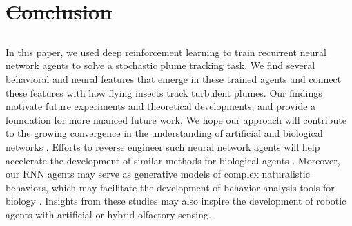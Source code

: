 \documentclass[5p,twocolumn,authoryear]{elsarticle}
\providecommand{\DIFaddtex}[1]{{\protect\color{blue}\uwave{#1}}} %
\providecommand{\DIFdeltex}[1]{{\protect\color{red}\sout{#1}}}                      %
\providecommand{\DIFaddbegin}{} %
\providecommand{\DIFaddend}{} %
\providecommand{\DIFdelbegin}{} %
\providecommand{\DIFdelend}{} %
\providecommand{\DIFadd}[1]{\texorpdfstring{\DIFaddtex{#1}}{#1}} %
\providecommand{\DIFdel}[1]{\texorpdfstring{\DIFdeltex{#1}}{}} %
\newcommand{\DIFscaledelfig}{0.5}
\newlength{\DIFdelgraphicswidth} %
\newlength{\DIFdelgraphicsheight} %
\newcommand{\DIFaddincludegraphics}[2][]{{\color{blue}\fbox{\DIFOincludegraphics[#1]{#2}}}} %
\newcommand{\DIFdelincludegraphics}[2][]{%
\sbox{\DIFdelgraphicsbox}{\DIFOincludegraphics[#1]{#2}}%
\settoboxwidth{\DIFdelgraphicswidth}{\DIFdelgraphicsbox} %
\settoboxtotalheight{\DIFdelgraphicsheight}{\DIFdelgraphicsbox} %
\scalebox{\DIFscaledelfig}{%
\parbox[b]{\DIFdelgraphicswidth}{\usebox{\DIFdelgraphicsbox}\\[-\baselineskip] \rule{\DIFdelgraphicswidth}{0em}}\llap{\resizebox{\DIFdelgraphicswidth}{\DIFdelgraphicsheight}{%
\setlength{\unitlength}{\DIFdelgraphicswidth}%
\begin{picture}(1,1)%
\thicklines\linethickness{2pt} %
{\color[rgb]{1,0,0}\put(0,0){\framebox(1,1){}}}%
{\color[rgb]{1,0,0}\put(0,0){\line( 1,1){1}}}%
{\color[rgb]{1,0,0}\put(0,1){\line(1,-1){1}}}%
\end{picture}%
}\hspace*{3pt}}} %
} %
\DeclareRobustCommand{\DIFaddbegin}{\DIFOaddbegin \let\includegraphics\DIFaddincludegraphics} %
\DeclareRobustCommand{\DIFaddend}{\DIFOaddend \let\includegraphics\DIFOincludegraphics} %
\DeclareRobustCommand{\DIFdelbegin}{\DIFOdelbegin \let\includegraphics\DIFdelincludegraphics} %
\DeclareRobustCommand{\DIFdelend}{\DIFOaddend \let\includegraphics\DIFOincludegraphics} %
\begin{document}
\DIFdelbegin \section{\DIFdel{Conclusion}} 
\addtocounter{section}{-1}%
\DIFdelend \DIFaddbegin \subsection*{\DIFadd{Conclusion}} 
\DIFaddend In this paper, we used deep reinforcement learning to train recurrent neural network agents to solve a stochastic plume tracking task.
We find several behavioral and neural features that emerge in these trained agents and connect these features with how flying insects track turbulent plumes.
Our findings motivate future experiments and theoretical developments, and provide a foundation for more nuanced future work.
We hope our approach will contribute to the growing convergence in the understanding of artificial and biological networks \citep{hasson2020direct,hassabis2017neuroscience}.
Efforts to reverse engineer such neural network agents will help accelerate the development of similar methods for biological agents \citep{kwon2020inverse,ashwood2020inferring}.
Moreover, our RNN agents may serve as generative models of complex naturalistic behaviors, which may facilitate the development of behavior analysis tools for biology \citep{berman2016predictability,singh2021mining,nassar2018tree}.
Insights from these studies may also inspire the development of robotic agents with artificial \citep{vouloutsi2013synthetic} or hybrid \citep{anderson2019smellicopter} olfactory sensing.


\DIFaddbegin \clearpage
\section*{\DIFadd{Methods}}
\end{document}
